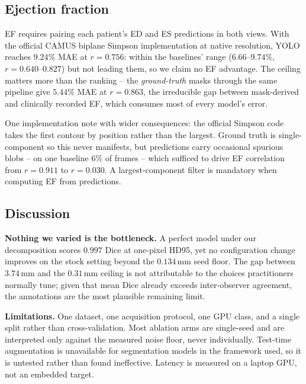 \subsection{Ejection fraction}

EF requires pairing each patient's ED and ES predictions in both views. With the
official CAMUS biplane Simpson implementation at native resolution, YOLO reaches
$9.24\%$ MAE at $r{=}0.756$: within the baselines' range ($6.66$--$9.74\%$,
$r{=}0.640$--$0.827$) but not leading them, so we claim no EF advantage. The
ceiling matters more than the ranking -- the \emph{ground-truth} masks through
the same pipeline give $5.44\%$ MAE at $r{=}0.863$, the irreducible gap between
mask-derived and clinically recorded EF, which consumes most of every model's
error.

One implementation note with wider consequences: the official Simpson code takes
the first contour by position rather than the largest. Ground truth is
single-component so this never manifests, but predictions carry occasional
spurious blobs -- on one baseline $6\%$ of frames -- which sufficed to drive EF
correlation from $r{=}0.911$ to $r{=}0.030$. A largest-component filter is
mandatory when computing EF from predictions.

\subsection{Discussion}

\textbf{Nothing we varied is the bottleneck.} A perfect model under our
decomposition scores $0.997$ Dice at one-pixel HD95, yet no configuration change
improves on the stock setting beyond the $0.134$\,mm seed floor. The gap between
$3.74$\,mm and the $0.31$\,mm ceiling is not attributable to the choices
practitioners normally tune; given that mean Dice already exceeds inter-observer
agreement, the annotations are the most plausible remaining limit.

\textbf{Limitations.} One dataset, one acquisition protocol, one GPU class, and
a single split rather than cross-validation. Most ablation arms are single-seed
and are interpreted only against the measured noise floor, never individually.
Test-time augmentation is unavailable for segmentation models in the framework
used, so it is untested rather than found ineffective. Latency is measured on a
laptop GPU, not an embedded target.

